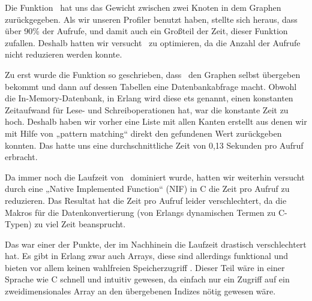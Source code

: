 Die Funktion \gtwght\ hat uns das Gewicht zwischen zwei Knoten in dem
Graphen zurückgegeben.  Als wir unseren Profiler benutzt haben,
stellte sich heraus, dass über 90\% der Aufrufe, und damit auch ein
Großteil der Zeit, dieser Funktion zufallen.  Deshalb hatten wir
versucht \gtwght\ zu optimieren, da die Anzahl der Aufrufe nicht
reduzieren werden konnte.

Zu erst wurde die Funktion so geschrieben, dass \gtwght\ den Graphen
selbst übergeben bekommt und dann auf dessen Tabellen eine
Datenbankabfrage macht.  Obwohl die In-Memory-Datenbank, in Erlang
wird diese ets genannt, einen konstanten Zeitaufwand für Lese- und
Schreiboperationen hat, war die konstante Zeit zu hoch.  Deshalb haben
wir vorher eine Liste mit allen Kanten erstellt aus denen wir mit
Hilfe von „pattern matching“ direkt den gefundenen Wert zurückgeben
konnten.  Das hatte uns eine durchschnittliche Zeit von 0,13 Sekunden
pro Aufruf erbracht.

Da immer noch die Laufzeit von \gtwght\ dominiert wurde, hatten wir
weiterhin versucht durch eine „Native Implemented Function“ (NIF) in C
die Zeit pro Aufruf zu reduzieren.  Das Resultat hat die Zeit pro
Aufruf leider verschlechtert, da die Makros für die Datenkonvertierung
(von Erlangs dynamischen Termen zu C-Typen) zu viel Zeit beansprucht.

Das war einer der Punkte, der im Nachhinein die Laufzeit drastisch
verschlechtert hat.  Es gibt in Erlang zwar auch Arrays, diese sind
allerdings funktional und bieten vor allem keinen wahlfreien
Speicherzugriff \cite[Kapitel~11]{lyse}.  Dieser Teil wäre in einer
Sprache wie C schnell und intuitiv gewesen, da einfach nur ein Zugriff
auf ein zweidimensionales Array an den übergebenen Indizes nötig
gewesen wäre.
